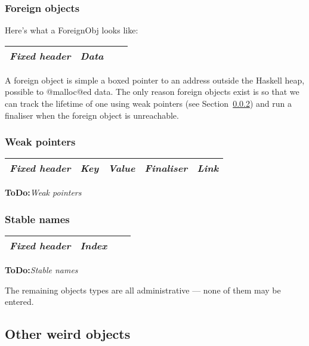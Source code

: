 \documentclass[11pt]{article}
\newcommand{\ToDo}[1]{{{\bf ToDo:}\sl #1}}
\newcommand{\secref}[1]{Section~\ref{sec:#1}}
\newcommand{\Subsubsection}[2]{\subsubsection{#1}\label{sec:#2}}
\begin{document}
\Subsubsection{Foreign objects}{FOREIGN}

Here's what a ForeignObj looks like:

\begin{center}
\begin{tabular}{|l|l|l|l|}
\hline 
\emph{Fixed header} & \emph{Data} \\
\hline
\end{tabular}
\end{center}

A foreign object is simple a boxed pointer to an address outside the
Haskell heap, possible to @malloc@ed data.  The only reason foreign
objects exist is so that we can track the lifetime of one using weak
pointers (see \secref{WEAK}) and run a finaliser when the foreign
object is unreachable.

\subsubsection{Weak pointers}
\label{sec:WEAK}

\begin{center}
\begin{tabular}{|l|l|l|l|l|}
\hline 
\emph{Fixed header} & \emph{Key} & \emph{Value} & \emph{Finaliser}
& \emph{Link}\\
\hline
\end{tabular}
\end{center}

\ToDo{Weak pointers}

\subsubsection{Stable names}
\label{sec:STABLE_NAME}

\begin{center}
\begin{tabular}{|l|l|l|l|}
\hline 
\emph{Fixed header} & \emph{Index} \\
\hline
\end{tabular}
\end{center}

\ToDo{Stable names}

The remaining objects types are all administrative --- none of them
may be entered.

\subsection{Other weird objects}
\label{sec:SPARK}
\label{sec:BLOCKED_FETCH}
\end{document}
